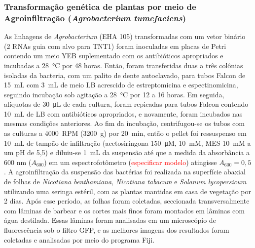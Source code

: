 \subsubsection{Transformação genética de plantas por meio de Agroinfiltração (\textit{Agrobacterium tumefaciens})}
As linhagens de \textit{Agrobacterium} (EHA 105) transformadas com um vetor
binário (2 RNAs guia com alvo para TNT1) foram inoculadas em placas de Petri
contendo um meio YEB suplementado com os antibióticos apropriados e incubadas a
\qty{28}{\celsius} por 48 horas. Então, foram transferidas duas a três colônias
isoladas da bacteria, com um palito de dente autoclavado, para tubos Falcon de
\qty{15}{mL} com \qty{3}{mL} de meio LB acrescido de estreptomicina e
espectinomicina, seguindo incubação sob agitação a \qty{28}{\celsius} por 12 a
16 horas. Em seguida, alíquotas de \qty{30}{\micro L} de cada cultura, foram
repicadas para tubos Falcon contendo \qty{10}{mL} de LB com antibióticos
apropriados, e novamente, foram incubados nas mesmas condições anteriores. Ao fim
da incubação, centrifugou-se os tubos com as culturas a \qty{4000}{RPM}
(\qty{3200}{g}) por \qty{20}{min}, então o pellet foi ressuspenso em
\qty{10}{mL} de tampão de infiltração (acetosiringona \qty{150}{\micro M},
 \qty{10}{mM}, MES \qty{10}{mM} a um pH de 5,5) e diluiu-se \qty{1}{mL}
da suspensão até que a medida da absorbância a 600 nm ($A_{600}$) em um
espectrofotômetro (\textcolor{red}{especificar modelo})  atingisse $A_{600} = 0,5$.
A agroinfiltração da suspensão das bactérias foi realizada na superfície abaxial
de folhas de \textit{Nicotiana benthamiana}, \textit{Nicotiana tabacum} e
\textit{Solanum lycopersicum} utilizando uma seringa estéril, com as plantas
mantidas em casa de vegetação por 2 dias. Após esse período, as folhas foram
coletadas, seccionada transversalmente com lâminas de barbear e os cortes mais
finos foram montados em lâminas com água destilada. Essas lâminas foram
analisadas em um microscópio de fluorescência sob o filtro GFP, e as melhores
imagens dos resultados foram coletadas e analisadas por meio do programa Fiji.  
